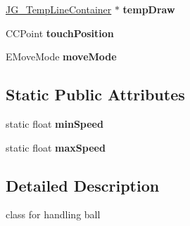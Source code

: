 \begin{DoxyCompactItemize}
\item 
\hypertarget{class_j_g___ball_aa0fc27312d724fcf2324e87844a99cb8}{\hyperlink{class_j_g___temp_line_container}{J\-G\-\_\-\-Temp\-Line\-Container} $\ast$ {\bfseries temp\-Draw}}\label{class_j_g___ball_aa0fc27312d724fcf2324e87844a99cb8}

\item 
\hypertarget{class_j_g___ball_aacc0e044d12a3fe88d03b54f8c800626}{C\-C\-Point {\bfseries touch\-Position}}\label{class_j_g___ball_aacc0e044d12a3fe88d03b54f8c800626}

\item 
\hypertarget{class_j_g___ball_a0ad0f2f4b8d03d63c879544111a24506}{E\-Move\-Mode {\bfseries move\-Mode}}\label{class_j_g___ball_a0ad0f2f4b8d03d63c879544111a24506}

\end{DoxyCompactItemize}
\subsection*{Static Public Attributes}
\begin{DoxyCompactItemize}
\item 
\hypertarget{class_j_g___ball_a0e5845ccdb93030b567b796f6266e517}{static float {\bfseries min\-Speed}}\label{class_j_g___ball_a0e5845ccdb93030b567b796f6266e517}

\item 
\hypertarget{class_j_g___ball_ad830251662cdf8443962aef638ffefcc}{static float {\bfseries max\-Speed}}\label{class_j_g___ball_ad830251662cdf8443962aef638ffefcc}

\end{DoxyCompactItemize}


\subsection{Detailed Description}
class for handling ball 


